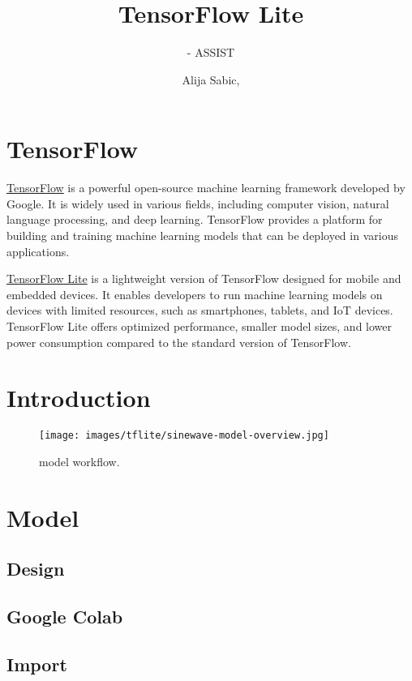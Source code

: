 \documentclass[aspectratio=169]{beamer}
\title[TensorFlow Lite]{TensorFlow Lite}
\subtitle{\glsentrytext{ci} - ASSIST \glsentrytext{heidi}}
\author{Alija Sabic, \glsentrytext{msc}}
\institute{Department Electronic Engineering}
\begin{document}
\begin{frame}[plain]
    \titlepage
\end{frame}

\section{TensorFlow}
\begin{frame}
    \par \href{https://www.tensorflow.org/}{TensorFlow} is a powerful open-source machine learning framework developed by Google.
    It is widely used in various fields, including computer vision, natural language processing, and deep learning.
    TensorFlow provides a platform for building and training machine learning models that can be deployed in various applications.
    \par \href{https://www.tensorflow.org/lite}{TensorFlow Lite} is a lightweight version of TensorFlow designed for mobile and embedded devices.
    It enables developers to run machine learning models on devices with limited resources, such as smartphones, tablets, and IoT devices.
    TensorFlow Lite offers optimized performance, smaller model sizes, and lower power consumption compared to the standard version of TensorFlow.
\end{frame}

\section{Introduction}
\begin{frame}
    \begin{figure}
        \texttt{[image: images/tflite/sinewave-model-overview.jpg]}
        \caption{ model workflow.}
    \end{figure}
\end{frame}

\section{Model}
\subsection{Design}

\subsection{Google Colab}

\subsection{Import}

\end{document}
